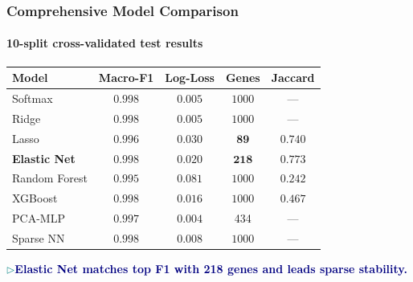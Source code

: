 \documentclass[aspectratio=169,11pt]{beamer}
\newcommand{\takeaway}[1]{%
  \par\vspace{0.08cm}%
  \noindent\colorbox{tealbg}{%
    \parbox{\dimexpr\linewidth-2\fboxsep\relax}{%
      \small\textbf{\textcolor{teal}{$\triangleright$}}\;\textbf{\textcolor{navy}{#1}}%
    }%
  }\par%
}
\begin{document}
\begin{frame}
\frametitle{Comprehensive Model Comparison}
\framesubtitle{10-split cross-validated test results}

\centering
\footnotesize
\begin{tabular}{lccc>{\small}c}
  \toprule
  \textbf{Model}
    & \textbf{Macro-F1}
    & \textbf{Log-Loss}
    & \textbf{Genes}
    & \textbf{Jaccard} \\
  \midrule
  Softmax       & $0.998$ & $0.005$ & $1000$ & --- \\
  Ridge         & $0.998$ & $0.005$ & $1000$ & --- \\
  Lasso         & $0.996$ & $0.030$ & $\mathbf{89}$   & $0.740$ \\
  \rowcolor{tealbg}
  \textbf{Elastic Net} & $\mathbf{0.998}$ & $\mathbf{0.020}$ & $\mathbf{218}$ & $\mathbf{0.773}$ \\
  Random Forest & $0.995$ & $0.081$ & $1000$ & $0.242$ \\
  XGBoost       & $0.998$ & $0.016$ & $1000$ & $0.467$ \\
  PCA-MLP       & $0.997$ & $0.004$ & 434 & --- \\
  Sparse NN     & $0.998$ & $0.008$ & $1000$ & --- \\
  \bottomrule
\end{tabular}

\vspace{0.18cm}
\takeaway{Elastic Net matches top F1 with 218 genes and leads sparse stability.}
\end{frame}
\end{document}
